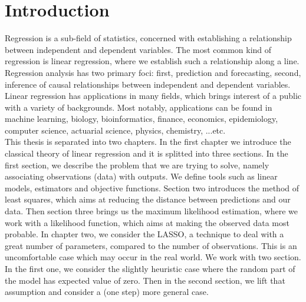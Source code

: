 \chapter{Introduction}

Regression is a sub-field of statistics, concerned with establishing a relationship between independent and dependent variables. The most common kind of regression is linear regression, where we establish such a relationship along a line. Regression analysis has two primary foci: first, prediction and forecasting, second, inference of causal relationships between independent and dependent variables. Linear regression has applications in many fields, which brings interest of a public with a variety of backgrounds. Most notably, applications can be found in machine learning, biology, bioinformatics, finance, economics, epidemiology, computer science, actuarial science, physics, chemistry, ...etc. \\
This thesis is separated into two chapters. In the first chapter we introduce the classical theory of linear regression and it is splitted into three sections. In the first section, we describe the problem that we are trying to solve, namely associating observations (data) with outputs. We define tools such as linear models, estimators and objective functions. Section two introduces the method of least squares, which aims at reducing the distance between predictions and our data. Then section three brings us the maximum likelihood estimation, where we work with a likelihood function, which aims at making the observed data most probable. In chapter two, we consider the LASSO, a technique to deal with a great number of parameters, compared to the number of observations. This is an uncomfortable case which may occur in the real world. We work with two section. In the first one, we consider the slightly heuristic case where the random part of the model has expected value of zero. Then in the second section, we lift that assumption and consider a (one step) more general case.
